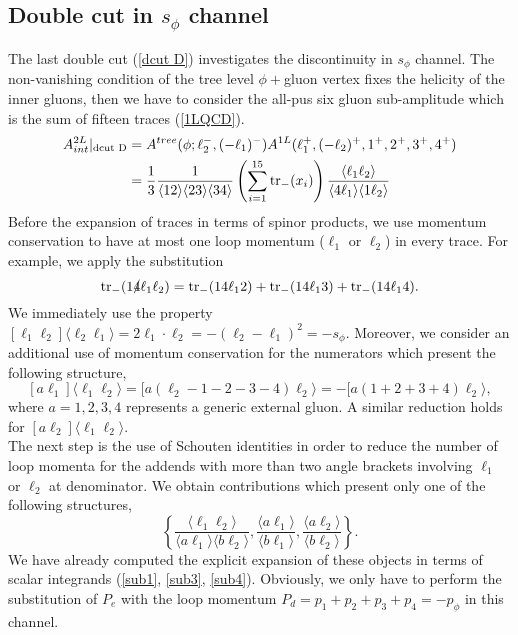 \subsection{Double cut in $s_{\phi}$ channel}	\label{sec:sphi1_3rdsec}
The last double cut (\ref{dcut D}) investigates the discontinuity in $s_\phi$ channel. The non-vanishing condition of the tree level $\phi+$gluon vertex fixes the helicity of the inner gluons, then we have to consider the all-pus six gluon sub-amplitude which is the sum of fifteen traces (\ref{1LQCD}).
\begin{align*}
	A^{2L}_{int}|_{\text{dcut D}}&=A^{tree}(\phi;\ell_2^-,(-\ell_1)^-)A^{1L}(\ell_1^+,(-\ell_2)^+,1^+,2^+,3^+,4^+)\\
	&=\frac{1}{3}\frac{1}{\langle 12 \rangle \langle 23 \rangle \langle 34 \rangle}\left(\sum_{i=1}^{15} \tr_-(x_i)\right)\frac{\langle \ell_1 \ell_2 \rangle}{\langle 4 \ell_1 \rangle \langle 1 \ell_2 \rangle}
\end{align*}
Before the expansion of traces in terms of spinor products, we use momentum conservation to have at most one loop momentum ($\ell_1$ or $\ell_2$) in every trace. For example, we apply the substitution
$$
	\tr_-( 1 \slashed 4 \ell_1 \ell_2)=\tr_-( 1  4 \ell_1  2)+\tr_-( 1  4  \ell_1  3)+\tr_-( 1  4 \ell_1  4).
$$
We immediately use the property $[\ell_1 \ell_2]\langle \ell_2 \ell_1\rangle=2\ell_1\cdot \ell_2=-(\ell_2-\ell_1)^2=-s_\phi$.
Moreover, we consider an additional use of momentum conservation for the numerators which present the following structure,
$$
	[a \ell_1]\langle \ell_1 \ell_2\rangle=[a(\ell_2-1-2-3-4)\ell_2\rangle=-[a(1+2+3+4)\ell_2\rangle,
$$
where $a=1,2,3,4$ represents a generic external gluon. A similar reduction holds for $[a \ell_2]\langle \ell_1\ell_2 \rangle$.\\
The next step is the use of Schouten identities in order to reduce the number of loop momenta for the  addends with more than two angle brackets involving $\ell_1$ or $\ell_2$ at denominator. We obtain contributions which present only one of the following structures,
$$
	\left\{\frac{\langle \ell_1 \ell_2 \rangle}{\langle a \ell_1 \rangle\langle b \ell_2\rangle},\frac{\langle a \ell_1 \rangle}{\langle b \ell_1 \rangle}, \frac{\langle a \ell_2 \rangle}{\langle b\ell_2\rangle}\right\}.
$$
We have already computed the explicit expansion of these objects in terms of scalar integrands (\ref{sub1}, \ref{sub3}, \ref{sub4}). Obviously, we only have to perform the substitution of $P_e$ with the loop momentum $P_d=p_1+p_2+p_3+p_4=-p_\phi$ in this channel. 
\iffalse
